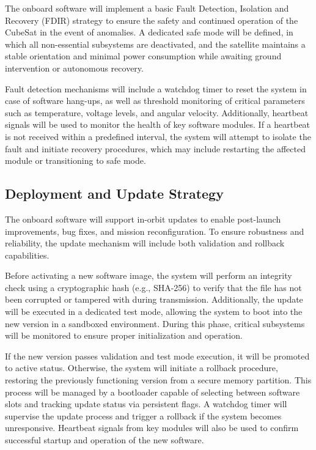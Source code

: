 The onboard software will implement a basic Fault Detection, Isolation and Recovery (FDIR) strategy to ensure the safety and continued operation of the CubeSat in the event of anomalies. A dedicated safe mode will be defined, in which all non-essential subsystems are deactivated, and the satellite maintains a stable orientation and minimal power consumption while awaiting ground intervention or autonomous recovery.

Fault detection mechanisms will include a watchdog timer to reset the system in case of software hang-ups, as well as threshold monitoring of critical parameters such as temperature, voltage levels, and angular velocity. Additionally, heartbeat signals will be used to monitor the health of key software modules. If a heartbeat is not received within a predefined interval, the system will attempt to isolate the fault and initiate recovery procedures, which may include restarting the affected module or transitioning to safe mode.

\subsection{Deployment and Update Strategy}

The onboard software will support in-orbit updates to enable post-launch improvements, bug fixes, and mission reconfiguration. To ensure robustness and reliability, the update mechanism will include both validation and rollback capabilities.

Before activating a new software image, the system will perform an integrity check using a cryptographic hash (e.g., SHA-256) to verify that the file has not been corrupted or tampered with during transmission. Additionally, the update will be executed in a dedicated test mode, allowing the system to boot into the new version in a sandboxed environment. During this phase, critical subsystems will be monitored to ensure proper initialization and operation.

If the new version passes validation and test mode execution, it will be promoted to active status. Otherwise, the system will initiate a rollback procedure, restoring the previously functioning version from a secure memory partition. This process will be managed by a bootloader capable of selecting between software slots and tracking update status via persistent flags. A watchdog timer will supervise the update process and trigger a rollback if the system becomes unresponsive. Heartbeat signals from key modules will also be used to confirm successful startup and operation of the new software.

